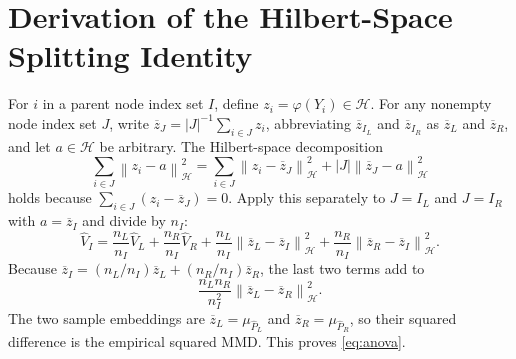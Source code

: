 \documentclass[12pt,a4paper]{article}
\newcommand{\calH}{\mathcal H}
\newcommand{\1}{\mathbf 1}
\newcommand{\norm}[1]{\left\lVert#1\right\rVert}
\begin{document}
\section{Derivation of the Hilbert-Space Splitting Identity}\label{app:anova}
For $i$ in a parent node index set $I$, define $z_i=\varphi(Y_i)\in\calH$. For any nonempty node index set $J$, write $\overline z_J=|J|^{-1}\sum_{i\in J}z_i$, abbreviating $\overline z_{I_L}$ and $\overline z_{I_R}$ as $\overline z_L$ and $\overline z_R$, and let $a\in\calH$ be arbitrary. The Hilbert-space decomposition
\[
 \sum_{i\in J}\norm{z_i-a}_{\calH}^2
 =\sum_{i\in J}\norm{z_i-\overline z_J}_{\calH}^2
  +|J|\norm{\overline z_J-a}_{\calH}^2
\]
holds because $\sum_{i\in J}(z_i-\overline z_J)=0$. Apply this separately to $J=I_L$ and $J=I_R$ with $a=\overline z_I$ and divide by $n_I$:
\[
 \widehat V_I=\frac{n_L}{n_I}\widehat V_L+\frac{n_R}{n_I}\widehat V_R
 +\frac{n_L}{n_I}\norm{\overline z_L-\overline z_I}_{\calH}^2
 +\frac{n_R}{n_I}\norm{\overline z_R-\overline z_I}_{\calH}^2.
\]
Because $\overline z_I=(n_L/n_I)\overline z_L+(n_R/n_I)\overline z_R$, the last two terms add to
\[
 \frac{n_Ln_R}{n_I^2}\norm{\overline z_L-\overline z_R}_{\calH}^2.
\]
The two sample embeddings are $\overline z_L=\mu_{\widehat P_L}$ and $\overline z_R=\mu_{\widehat P_R}$, so their squared difference is the empirical squared MMD. This proves \eqref{eq:anova}.
\end{document}
